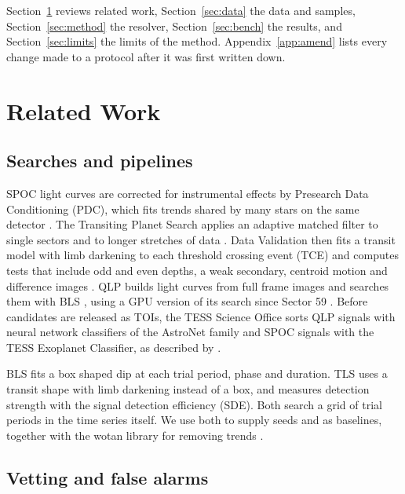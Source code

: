 \documentclass[twocolumn,linenumbers]{aastex701}
\begin{document}
Section~\ref{sec:related} reviews related work, Section~\ref{sec:data} the data and samples, Section~\ref{sec:method} the resolver, Section~\ref{sec:bench} the results, and Section~\ref{sec:limits} the limits of the method. Appendix~\ref{app:amend} lists every change made to a protocol after it was first written down.

\section{Related Work} \label{sec:related}

\subsection{Searches and pipelines}

SPOC light curves are corrected for instrumental effects by Presearch Data Conditioning (PDC), which fits trends shared by many stars on the same detector \citep{Smith2012,Stumpe2012}. The Transiting Planet Search applies an adaptive matched filter to single sectors and to longer stretches of data \citep{Jenkins2002,Jenkins2010,Jenkins2016}. Data Validation then fits a transit model with limb darkening to each threshold crossing event (TCE) and computes tests that include odd and even depths, a weak secondary, centroid motion and difference images \citep{Twicken2018,Li2019}. QLP builds light curves from full frame images and searches them with BLS \citep{Huang2020a,Huang2020b,Kunimoto2021,Kunimoto2022}, using a GPU version of its search since Sector 59 \citep{Kunimoto2023qlp}. Before candidates are released as TOIs, the TESS Science Office sorts QLP signals with neural network classifiers of the AstroNet family \citep{Yu2019,Tey2023} and SPOC signals with the TESS Exoplanet Classifier, as described by \citet{Guerrero2021}.

BLS \citep{Kovacs2002} fits a box shaped dip at each trial period, phase and duration. TLS \citep{Hippke2019tls} uses a transit shape with limb darkening instead of a box, and measures detection strength with the signal detection efficiency (SDE). Both search a grid of trial periods in the time series itself. We use both to supply seeds and as baselines, together with the wotan library for removing trends \citep{Hippke2019wotan}.

\subsection{Vetting and false alarms}
\end{document}
